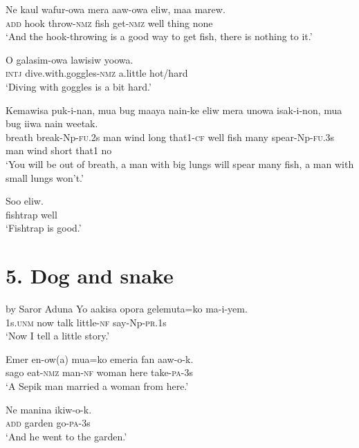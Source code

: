 {\ea\label{ex:a:x54}
\gll  Ne  kaul  wafur-owa  mera  aaw-owa  eliw,  maa  marew. \\
\textsc{add}  hook  throw-\textsc{nmz}  fish  get-\textsc{nmz}  well  thing  none \\
\glt ‘And the hook-throwing is a good way to get fish, there is nothing to it.’ \\
\z


\ea\label{ex:a:x55}
\gll  O  galasim-owa  lawisiw  yoowa. \\
\textsc{intj}  dive.with.goggles-\textsc{nmz}  a.little  hot/hard \\
\glt ‘Diving with goggles is a bit hard.’ \\
\z


\ea\label{ex:a:x56}
\gll  Kemawisa  puk-i-nan,  mua  bug  maaya  nain-ke  eliw  mera  unowa  isak-i-non,  mua  bug  iiwa  nain  weetak. \\
breath  break-Np-\textsc{fu}.2s  man  wind  long  that1-\textsc{cf}  well     fish  many  spear-Np-\textsc{fu}.3s  man  wind  short  that1  no \\


\glt ‘You will be out of breath, a man with big lungs will spear many fish, a man with small lungs won’t.’ \\
\z


\ea\label{ex:a:x57}
\gll  Soo  eliw. \\
fishtrap  well \\
\glt ‘Fishtrap is good.’ \\
\z


\section{5. Dog and snake}
  by Saror Aduna
\ea\label{ex:a:x1}
\gll  Yo  aakisa  opora  gelemuta=ko  ma-i-yem. \\
1s.\textsc{unm}  now  talk  little-\textsc{nf}  say-Np-\textsc{pr}.1s \\
\glt ‘Now I tell a little story.’ \\
\z


\ea\label{ex:a:x2}
\gll  Emer  en-ow(a)  mua=ko  emeria  fan  aaw-o-k. \\
sago  eat-\textsc{nmz}  man-\textsc{nf}  woman  here  take-\textsc{pa}-3s \\
\glt ‘A Sepik man married a woman from here.’ \\
\z


\ea\label{ex:a:x3}
\gll  Ne  manina  ikiw-o-k. \\
\textsc{add}  garden  go-\textsc{pa}-3s \\
\glt ‘And he went to the garden.’ \\
\z


}
